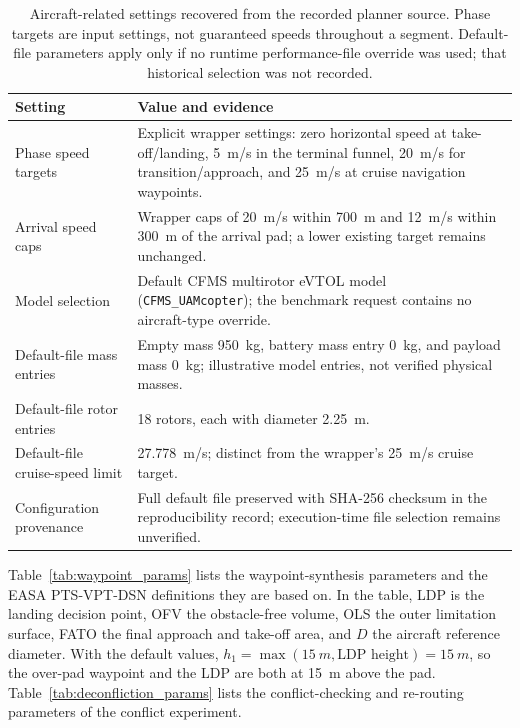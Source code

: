 \begin{table}[H]
    \centering
    \caption{Aircraft-related settings recovered from the recorded planner source. Phase targets are input settings, not guaranteed speeds throughout a segment. Default-file parameters apply only if no runtime performance-file override was used; that historical selection was not recorded.}
    \label{tab:aircraft_configuration}
    \small
    \begin{tabularx}{\textwidth}{lX}
        \toprule
        Setting & Value and evidence \\
        \midrule
        Phase speed targets & Explicit wrapper settings: zero horizontal speed at take-off/landing, \SI{5}{m/s} in the terminal funnel, \SI{20}{m/s} for transition/approach, and \SI{25}{m/s} at cruise navigation waypoints. \\
        Arrival speed caps & Wrapper caps of \SI{20}{m/s} within \SI{700}{m} and \SI{12}{m/s} within \SI{300}{m} of the arrival pad; a lower existing target remains unchanged. \\
        Model selection & Default CFMS multirotor eVTOL model (\texttt{CFMS\_UAMcopter}); the benchmark request contains no aircraft-type override. \\
        Default-file mass entries & Empty mass \SI{950}{kg}, battery mass entry \SI{0}{kg}, and payload mass \SI{0}{kg}; illustrative model entries, not verified physical masses. \\
        Default-file rotor entries & 18 rotors, each with diameter \SI{2.25}{m}. \\
        Default-file cruise-speed limit & \SI{27.778}{m/s}; distinct from the wrapper's \SI{25}{m/s} cruise target. \\
        Configuration provenance & Full default file preserved with SHA-256 checksum in the reproducibility record; execution-time file selection remains unverified. \\
        \bottomrule
    \end{tabularx}
\end{table}

Table~\ref{tab:waypoint_params} lists the waypoint-synthesis parameters and the EASA PTS-VPT-DSN definitions they are based on. In the table, LDP is the landing decision point, OFV the obstacle-free volume, OLS the outer limitation surface, FATO the final approach and take-off area, and \(D\) the aircraft reference diameter. With the default values, \(h_1 = \max(\SI{15}{m}, \text{LDP height}) = \SI{15}{m}\), so the over-pad waypoint and the LDP are both at \SI{15}{m} above the pad. Table~\ref{tab:deconfliction_params} lists the conflict-checking and re-routing parameters of the conflict experiment.

